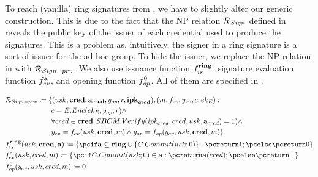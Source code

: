 To reach (vanilla) ring signatures from \UAS, we have to slightly alter our
generic construction. This is due to the fact that the NP relation
$\mathcal{R}_{Sign}$ defined in  reveals the
public key of the issuer of each credential used to produce the signatures.
This is a problem as, intuitively, the signer in a ring
signature is a sort of issuer for the ad hoc group. To hide the issuer, we
replace the NP relation in  with
$\mathcal{R}_{Sign-prv}$. We also use issuance function $f_{is}^{\mathbf{ring}}$,
signature evaluation function $f_{ev}^{\mathbf{a}}$, and opening function
$f_{op}^0$. All of them are specified in .

\begin{align}
  & \NIZKRel_{\Sign-prv} \coloneqq \lbrace (\usk,\scred,\attrs_{\scred},\yinsp,r,
    \sipk_{\scred}),(\msg,\feval,\yeval,\Ec,\Eek): \nonumber \\
  & \hspace*{6.405em}\Ec = \EEnc(\Eek,\yinsp;r) \land \nonumber \\
  & \hspace*{6.40em}\forall \cred \in \scred,\SBCMVerify(\ipk_{\cred},\cred,\usk,
    \attrs_{\cred}) = 1) \land \nonumber \\
  & \hspace*{6.40em}\yeval = \feval(\usk,\scred,\msg) \land
    \yinsp = \finsp(\yeval,\usk,\scred,\msg)
     \rbrace \nonumber \\
  & \fissue^{\sring}(\usk,\scred,\attrs) \coloneqq \lbrace \pcif \attrs
    \subseteq \sring \cup \lbrace \CCommit(\usk;0) \rbrace: \pcreturn 1; \pcelse
    \pcreturn 0 \rbrace \nonumber \\
  & \feval^{\attrs}(\usk,\cred,\msg) \coloneqq \lbrace \pcif \CCommit(\usk;0) \in
    \attrs: \pcreturn \attrs(\cred); \pcelse \pcreturn \bot \rbrace \nonumber \\
  & \finsp^0(\yeval,\usk,\cred,\msg) \coloneqq 0 \label{eq:uas-ring-funcs}
\end{align}

